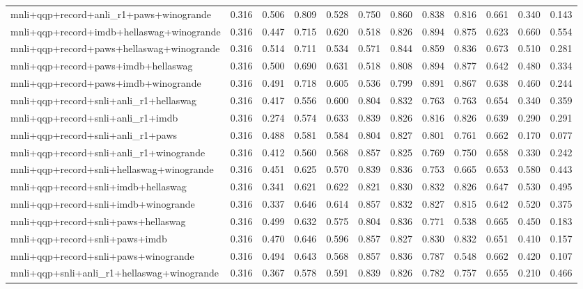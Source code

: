 \begin{table}[t]
\begin{tabular}{lrrrrrrrrrrr}
    mnli+qqp+record+anli\_r1+paws+winogrande & 0.316 & 0.506 & 0.809 & 0.528 & 0.750 & 0.860 & 0.838 & 0.816 & 0.661 & 0.340 & 0.143 \\
    mnli+qqp+record+imdb+hellaswag+winogrande & 0.316 & 0.447 & 0.715 & 0.620 & 0.518 & 0.826 & 0.894 & 0.875 & 0.623 & 0.660 & 0.554 \\
    mnli+qqp+record+paws+hellaswag+winogrande & 0.316 & 0.514 & 0.711 & 0.534 & 0.571 & 0.844 & 0.859 & 0.836 & 0.673 & 0.510 & 0.281 \\
    mnli+qqp+record+paws+imdb+hellaswag & 0.316 & 0.500 & 0.690 & 0.631 & 0.518 & 0.808 & 0.894 & 0.877 & 0.642 & 0.480 & 0.334 \\
    mnli+qqp+record+paws+imdb+winogrande & 0.316 & 0.491 & 0.718 & 0.605 & 0.536 & 0.799 & 0.891 & 0.867 & 0.638 & 0.460 & 0.244 \\
    mnli+qqp+record+snli+anli\_r1+hellaswag & 0.316 & 0.417 & 0.556 & 0.600 & 0.804 & 0.832 & 0.763 & 0.763 & 0.654 & 0.340 & 0.359 \\
    mnli+qqp+record+snli+anli\_r1+imdb & 0.316 & 0.274 & 0.574 & 0.633 & 0.839 & 0.826 & 0.816 & 0.826 & 0.639 & 0.290 & 0.291 \\
    mnli+qqp+record+snli+anli\_r1+paws & 0.316 & 0.488 & 0.581 & 0.584 & 0.804 & 0.827 & 0.801 & 0.761 & 0.662 & 0.170 & 0.077 \\
    mnli+qqp+record+snli+anli\_r1+winogrande & 0.316 & 0.412 & 0.560 & 0.568 & 0.857 & 0.825 & 0.769 & 0.750 & 0.658 & 0.330 & 0.242 \\
    mnli+qqp+record+snli+hellaswag+winogrande & 0.316 & 0.451 & 0.625 & 0.570 & 0.839 & 0.836 & 0.753 & 0.665 & 0.653 & 0.580 & 0.443 \\
    mnli+qqp+record+snli+imdb+hellaswag & 0.316 & 0.341 & 0.621 & 0.622 & 0.821 & 0.830 & 0.832 & 0.826 & 0.647 & 0.530 & 0.495 \\
    mnli+qqp+record+snli+imdb+winogrande & 0.316 & 0.337 & 0.646 & 0.614 & 0.857 & 0.832 & 0.827 & 0.815 & 0.642 & 0.520 & 0.375 \\
    mnli+qqp+record+snli+paws+hellaswag & 0.316 & 0.499 & 0.632 & 0.575 & 0.804 & 0.836 & 0.771 & 0.538 & 0.665 & 0.450 & 0.183 \\
    mnli+qqp+record+snli+paws+imdb & 0.316 & 0.470 & 0.646 & 0.596 & 0.857 & 0.827 & 0.830 & 0.832 & 0.651 & 0.410 & 0.157 \\
    mnli+qqp+record+snli+paws+winogrande & 0.316 & 0.494 & 0.643 & 0.568 & 0.857 & 0.836 & 0.787 & 0.548 & 0.662 & 0.420 & 0.107 \\
    mnli+qqp+snli+anli\_r1+hellaswag+winogrande & 0.316 & 0.367 & 0.578 & 0.591 & 0.839 & 0.826 & 0.782 & 0.757 & 0.655 & 0.210 & 0.466 \\

\end{tabular}
\end{table}
